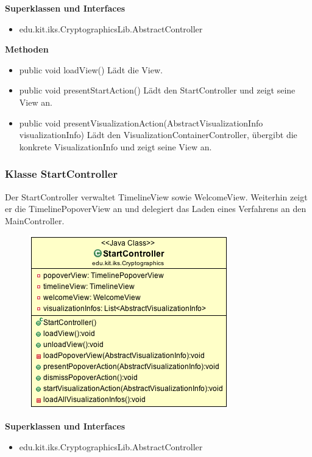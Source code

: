 \documentclass{article}
\begin{document}
      \textbf{Superklassen und Interfaces}
      \begin{itemize}
        \item edu.kit.iks.CryptographicsLib.AbstractController
      \end{itemize}
      
      \textbf{Methoden}
      \begin{itemize}
        \item public void loadView() \newline
        Lädt die View.
        \item public void presentStartAction() \newline
        Lädt den StartController und zeigt seine View an.
        \item public void presentVisualizationAction(AbstractVisualizationInfo visualizationInfo) \newline
        Lädt den VisualizationContainerController, übergibt die konkrete VisualizationInfo und zeigt seine View an.
      \end{itemize}

    \subsubsection{Klasse StartController}
      Der StartController verwaltet TimelineView sowie WelcomeView. Weiterhin zeigt er die TimelinePopoverView an und delegiert das Laden eines Verfahrens an den MainController.
      \begin{figure}[H]
        \centering
        \includegraphics{resources/edu-kit-iks-Cryptographics-StartController}
      \end{figure}

      \textbf{Superklassen und Interfaces}
      \begin{itemize}
        \item edu.kit.iks.CryptographicsLib.AbstractController
      \end{itemize}
      
\end{document}
